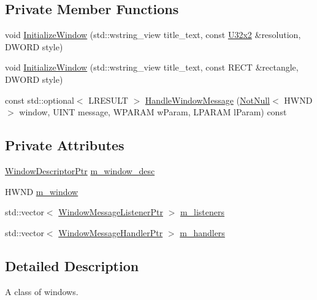 \subsection*{Private Member Functions}
\begin{DoxyCompactItemize}
\item 
void \mbox{\hyperlink{classmage_1_1_window_ab7b24a4e5b40c170d76f4542d625ba8f}{Initialize\+Window}} (std\+::wstring\+\_\+view title\+\_\+text, const \mbox{\hyperlink{namespacemage_ae5e7ccf8a1785baaacf57b3a0f4324e2}{U32x2}} \&resolution, D\+W\+O\+RD style)
\item 
void \mbox{\hyperlink{classmage_1_1_window_af79dceb2f68d742c5863a9fe01229735}{Initialize\+Window}} (std\+::wstring\+\_\+view title\+\_\+text, const R\+E\+CT \&rectangle, D\+W\+O\+RD style)
\item 
const std\+::optional$<$ L\+R\+E\+S\+U\+LT $>$ \mbox{\hyperlink{classmage_1_1_window_a1e79c3ae443ee043c85dad52c37caf78}{Handle\+Window\+Message}} (\mbox{\hyperlink{namespacemage_a8769f9d670d6b585ea306cb1062af94b}{Not\+Null}}$<$ H\+W\+ND $>$ window, U\+I\+NT message, W\+P\+A\+R\+AM w\+Param, L\+P\+A\+R\+AM l\+Param) const
\end{DoxyCompactItemize}
\subsection*{Private Attributes}
\begin{DoxyCompactItemize}
\item 
\mbox{\hyperlink{classmage_1_1_window_ac41b052d8e8dd0571b3ec862e8f6da05}{Window\+Descriptor\+Ptr}} \mbox{\hyperlink{classmage_1_1_window_a51bbea46f4590a68d384d0b8d14e0cd8}{m\+\_\+window\+\_\+desc}}
\item 
H\+W\+ND \mbox{\hyperlink{classmage_1_1_window_a5ca72a18801ff9e6abc309949d7b08b4}{m\+\_\+window}}
\item 
std\+::vector$<$ \mbox{\hyperlink{classmage_1_1_window_a0e0a4f2a3f6db176f6aec454b94a06fb}{Window\+Message\+Listener\+Ptr}} $>$ \mbox{\hyperlink{classmage_1_1_window_a28aab68439dc39058a7e507b0cd8c60b}{m\+\_\+listeners}}
\item 
std\+::vector$<$ \mbox{\hyperlink{classmage_1_1_window_add1d792fb9f71e70d4fb07409d80cfdd}{Window\+Message\+Handler\+Ptr}} $>$ \mbox{\hyperlink{classmage_1_1_window_a7438964a7b8c196d84da24cf789e5bd9}{m\+\_\+handlers}}
\end{DoxyCompactItemize}


\subsection{Detailed Description}
A class of windows. 

